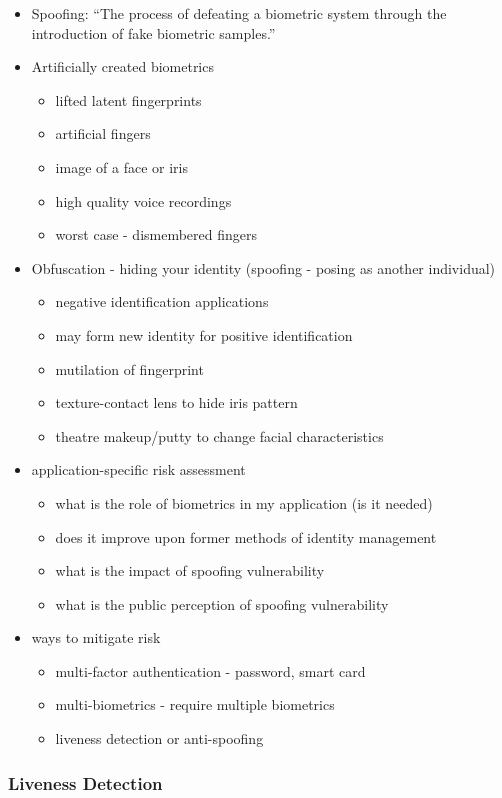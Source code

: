 \documentclass[paper=a4, fontsize=11pt]{scrartcl} %
\numberwithin{equation}{section} %
\numberwithin{figure}{section} %
\numberwithin{table}{section} %
\begin{document}
\begin{itemize}
\item Spoofing: ``The process of defeating a biometric system through the introduction of fake biometric samples.''
\item Artificially created biometrics
\begin{itemize}
\item lifted latent fingerprints
\item artificial fingers
\item image of a face or iris
\item high quality voice recordings
\item worst case - dismembered fingers
\end{itemize}
\item Obfuscation - hiding your identity (spoofing - posing as another individual)
\begin{itemize}
\item negative identification applications
\item may form new identity for positive identification
\item mutilation of fingerprint
\item texture-contact lens to hide iris pattern
\item theatre makeup/putty to change facial characteristics
\end{itemize}
\item application-specific risk assessment
\begin{itemize}
\item what is the role of biometrics in my application (is it needed)
\item does it improve upon former methods of identity management
\item what is the impact of spoofing vulnerability
\item what is the public perception of spoofing vulnerability
\end{itemize}
\item ways to mitigate risk
\begin{itemize}
\item multi-factor authentication - password, smart card
\item multi-biometrics - require multiple biometrics
\item liveness detection or anti-spoofing
\end{itemize}
\end{itemize}

\subsubsection{Liveness Detection}
\end{document}
